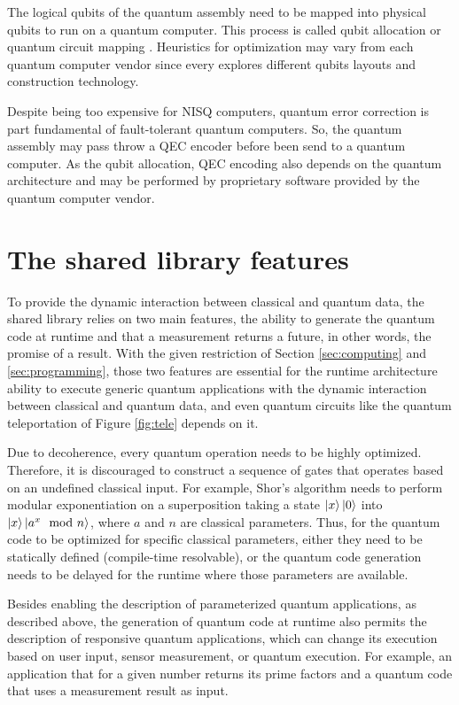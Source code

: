 \documentclass[preprint,3p,times,twocolumn]{elsarticle}
\begin{document}
The logical qubits of the quantum assembly need to be mapped into physical
qubits to run on a quantum computer. This process is called qubit allocation
\cite{Siraichi2018} or quantum circuit mapping \cite{Itoko2020}. Heuristics for
optimization may vary from each quantum computer vendor since every explores
different qubits layouts and construction technology. 

Despite being too expensive for NISQ computers, quantum error correction is
part fundamental of fault-tolerant quantum computers. So, the quantum assembly
may pass throw a QEC encoder before been send to a quantum computer. As the
qubit allocation, QEC encoding also depends on the quantum architecture and may
be performed by proprietary software provided by the quantum computer vendor.

\section{The shared library features}
\label{sec:lib}

To provide the dynamic interaction between classical and quantum data, the
shared library relies on two main features, the ability to generate the quantum
code at runtime and that a measurement returns a future, in other words, the
promise of a result. With the given restriction of Section \ref{sec:computing}
and \ref{sec:programming},  those two features are essential for the runtime
architecture ability to execute generic quantum applications with the dynamic
interaction between classical and quantum data, and even quantum circuits like
the quantum teleportation of Figure \ref{fig:tele} depends on it.

Due to decoherence, every quantum operation needs to be highly optimized.
Therefore, it is discouraged to construct a sequence of gates that operates
based on an undefined classical input. For example, Shor's algorithm needs to
perform modular exponentiation on a superposition taking a state $\ket{x}\ket0$
into $\ket{x}\ket{a^x \mod n}$, where $a$ and $n$ are classical parameters.
Thus, for the quantum code to be optimized for specific classical parameters,
either they need to be statically defined (compile-time resolvable), or the
quantum code generation needs to be delayed for the runtime where those
parameters are available.

Besides enabling the description of parameterized quantum applications, as
described above, the generation of quantum code at runtime also permits the
description of responsive quantum applications, which can change its execution
based on user input, sensor measurement, or quantum execution. For example, an
application that for a given number returns its prime factors and a quantum
code that uses a measurement result as input.
\end{document}
